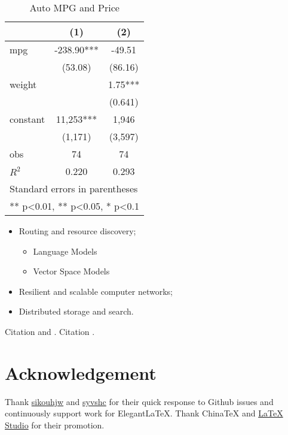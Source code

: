 \documentclass[en,normal,12pt,blue]{elegantnote}
\begin{document}
\begin{table}[htbp]
  \small
  \centering
  \caption{Auto MPG and Price \label{tab:reg}}
    \begin{tabular}{lcc}
    \toprule
                    &       (1)         &        (2)      \\
    \midrule
    mpg             &    -238.90***     &      -49.51     \\
                    &     (53.08)       &      (86.16)    \\
    weight          &                   &      1.75***    \\
                    &                   &      (0.641)    \\
    constant        &     11,253***     &       1,946     \\
                    &     (1,171)       &      (3,597)   \\
    obs             &        74         &         74     \\
    $R^2$           &      0.220        &       0.293    \\
    \bottomrule
    \multicolumn{3}{l}{\scriptsize Standard errors in parentheses} \\
    \multicolumn{3}{l}{\scriptsize *** p<0.01, ** p<0.05, * p<0.1} \\
    \end{tabular}%
\end{table}%


\begin{itemize}[noitemsep]
  \item Routing and resource discovery;
    \begin{itemize}
      \item Language Models
      \item Vector Space Models
    \end{itemize}
  \item Resilient and scalable computer networks;
  \item Distributed storage and search.
\end{itemize}


Citation \cite{Tadmor2012} and \cite{Adams2003,TreWei2014}.  Citation \cite{Adams2003,Shen1994}.

\section{Acknowledgement}

Thank \href{https://github.com/sikouhjw}{sikouhjw} and \href{https://github.com/syvshc}{syvshc} for their quick response to Github issues and continuously support work for ElegantLaTeX. Thank ChinaTeX and \href{http://www.latexstudio.net/}{LaTeX Studio} for their promotion.
\end{document}

